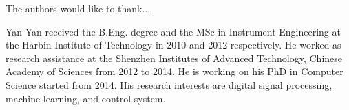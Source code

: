 \documentclass[journal]{IEEEtran}
\begin{document}
The authors would like to thank...


\ifCLASSOPTIONcaptionsoff
  \newpage
\fi



%
%
%


  

% 

\begin{IEEEbiography}{Yan Yan}
received the B.Eng. degree and the MSc in Instrument Engineering at the Harbin Institute of Technology in 2010 and 2012 respectively. 
He worked as research assistance at the Shenzhen Institutes of Advanced Technology, Chinese Academy of Sciences from 2012 to 2014. 
He is working on his PhD in Computer Science started from 2014.
His research interests are digital signal processing, machine learning, and control system.
\end{IEEEbiography}
\end{document}
